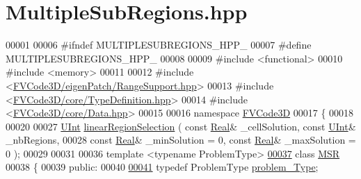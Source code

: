 \hypertarget{MultipleSubRegions_8hpp_source}{}\section{Multiple\+Sub\+Regions.\+hpp}
\label{MultipleSubRegions_8hpp_source}

\begin{DoxyCode}
00001 
00006 \textcolor{preprocessor}{#ifndef MULTIPLESUBREGIONS\_HPP\_}
00007 \textcolor{preprocessor}{#define MULTIPLESUBREGIONS\_HPP\_}
00008 
00009 \textcolor{preprocessor}{#include <functional>}
00010 \textcolor{preprocessor}{#include <memory>}
00011 
00012 \textcolor{preprocessor}{#include <\hyperlink{RangeSupport_8hpp}{FVCode3D/eigenPatch/RangeSupport.hpp}>}
00013 \textcolor{preprocessor}{#include <\hyperlink{TypeDefinition_8hpp}{FVCode3D/core/TypeDefinition.hpp}>}
00014 \textcolor{preprocessor}{#include <\hyperlink{Data_8hpp}{FVCode3D/core/Data.hpp}>}
00015 
00016 \textcolor{keyword}{namespace }\hyperlink{namespaceFVCode3D}{FVCode3D}
00017 \{
00018 
00020 
00027 \hyperlink{namespaceFVCode3D_a4bf7e328c75d0fd504050d040ebe9eda}{UInt} \hyperlink{namespaceFVCode3D_ae0b3b38fc8dff58445ba3d625deae285}{linearRegionSelection} ( \textcolor{keyword}{const} \hyperlink{namespaceFVCode3D_a40c1f5588a248569d80aa5f867080e83}{Real}& \_cellSolution, \textcolor{keyword}{const} 
      \hyperlink{namespaceFVCode3D_a4bf7e328c75d0fd504050d040ebe9eda}{UInt}& \_nbRegions,
00028                              \textcolor{keyword}{const} \hyperlink{namespaceFVCode3D_a40c1f5588a248569d80aa5f867080e83}{Real}& \_minSolution = 0, \textcolor{keyword}{const} \hyperlink{namespaceFVCode3D_a40c1f5588a248569d80aa5f867080e83}{Real}& \_maxSolution = 0 );
00029 
00031 
00036 \textcolor{keyword}{template} <\textcolor{keyword}{typename} ProblemType>
\hypertarget{MultipleSubRegions_8hpp_source.tex_l00037}{}\hyperlink{classFVCode3D_1_1MSR}{00037} \textcolor{keyword}{class }\hyperlink{classFVCode3D_1_1MSR}{MSR}
00038 \{
00039 \textcolor{keyword}{public}:
00040 
\hypertarget{MultipleSubRegions_8hpp_source.tex_l00041}{}\hyperlink{classFVCode3D_1_1MSR_aee0f8176a894e4f695baa08af10d14cf}{00041}     \textcolor{keyword}{typedef} ProblemType \hyperlink{classFVCode3D_1_1MSR_aee0f8176a894e4f695baa08af10d14cf}{problem\_Type};

\end{DoxyCode}
